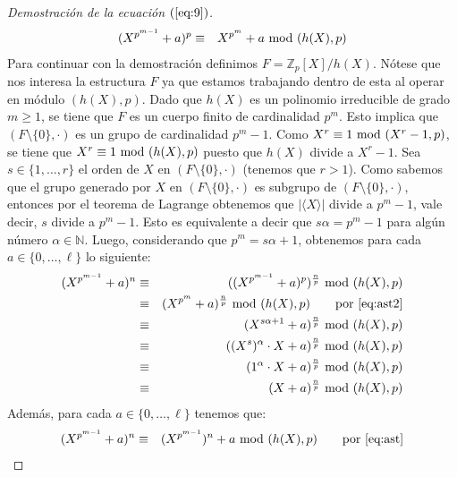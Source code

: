 \begin{proof}[Demostración de la ecuación $(\ref{eq:9})$]
\begin{eqnarray}
		    (X^{p^{m-1}}+a)^p & \equiv & X^{p^{m}} +a \!\!\mod (h(X),p) \label{eq:ast2} 
		\end{eqnarray}
		Para continuar con la demostración definimos $F = \mathbb{Z}_p[X]/h(X)$. Nótese que nos interesa la estructura $F$ ya que estamos trabajando dentro de esta al operar en módulo $(h(X),p)$. Dado que $h(X)$ es un polinomio irreducible de grado $m\geq 1$, se tiene que $F$ es un cuerpo finito de cardinalidad $p^m$. Esto implica que $(F\setminus\{0\},\cdot)$ 
		es un grupo de cardinalidad $p^m-1$.
		Como $X^r\equiv 1 \!\!\mod (X^r-1,p)$, se tiene que $X^r\equiv 1 \!\!\mod (h(X),p)$ puesto que $h(X)$ divide a $X^r-1$.
		Sea $s \in \{1, \ldots, r\}$ el orden de $X$ en $(F\setminus\{0\},\cdot)$ (tenemos que $r > 1$).
		 Como sabemos que el grupo  generado por $X$ en $(F\setminus\{0\},\cdot)$ es subgrupo de $(F\setminus\{0\},\cdot)$, entonces por el teorema de Lagrange obtenemos que $|\langle X\rangle |$ divide a $p^m-1$, vale decir, $s$ divide a $p^m-1$. Esto es equivalente a decir que $s \alpha = p^m -1$ para algún número $\alpha \in \mathbb{N}$. Luego, considerando que  %
		$p^m=s\alpha +1$, obtenemos para cada $a \in \{0, \ldots, \ell\}$ lo siguiente:
		\begin{eqnarray}
		    (X^{p^{m-1}}+a)^n & \equiv &((X^{p^{m-1}}+a)^p)^{\frac{n}{p}}\modulohps\nonumber\\
		    & \equiv &(X^{p^{m}}+a)^{\frac{n}{p}}\modulohps \quad\quad \text{por }\eqref{eq:ast2} \nonumber\\
		    & \equiv &(X^{s\alpha +1}+a)^{\frac{n}{p}}\modulohps\nonumber\\
		    & \equiv &((X^{s})^{\alpha} \cdot X+a)^{\frac{n}{p}}\modulohps\nonumber\\
		    & \equiv &(1^{\alpha} \cdot X+a)^{\frac{n}{p}}\modulohps\nonumber\\
		    & \equiv &(X+a)^{\frac{n}{p}}\modulohps\label{eq:+}
		\end{eqnarray}
		Además, para cada $a \in \{0, \ldots, \ell\}$ tenemos que:
		\begin{eqnarray}
		    (X^{p^{m-1}}+a)^n & \equiv &(X^{p^{m-1}})^n + a\modulohps \quad\quad \text{por }\eqref{eq:ast} \nonumber\\

\end{eqnarray}
\end{proof}

